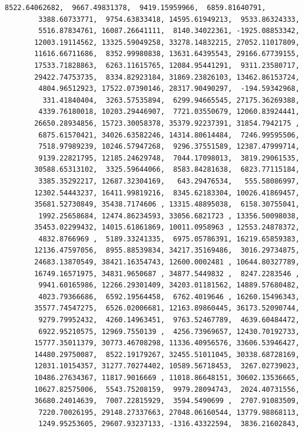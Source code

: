 \documentclass[11pt,a4paper]{report}
\begin{document}
\begin{tcolorbox}[breakable, size=fbox, boxrule=.5pt, pad at break*=1mm, opacityfill=0]
\begin{Verbatim}[commandchars=\\\{\}]
        8522.64062682,  9667.49831378,  9419.15959966,  6859.81640791,
        3388.60733771,  9754.63833418, 14595.61949213,  9533.86324333,
        5516.87834761, 16087.26641111,  8140.34022361, -1925.08853342,
       12003.19114562, 13325.59049258, 33278.14832215, 27052.11017809,
       11616.66711686,  8352.99980838, 13631.64395543, 29166.67739155,
       17533.71828863,  6263.11615765, 12084.95441291,  9311.23580717,
       29422.74753735,  8334.82923184, 31869.23826103, 13462.86153724,
        4804.96512923, 17522.07390146, 28317.90490297,  -194.59342968,
         331.41840404,  3263.57535894,  6299.94665545, 27175.36269388,
        4339.76180018, 10203.29446907,  7721.03550679, 12060.83924441,
       26650.28934856, 15723.30058378, 35379.92237391, 31854.7942175 ,
        6875.61570421, 34026.63582246, 14314.80614484,  7246.99595506,
        7518.97989239, 10246.57947268,  9296.37551589, 12387.47999714,
        9139.22821795, 12185.24629748,  7044.17098013,  3819.29061535,
       30588.65313102,  3325.59644066,  8583.84281638,  6823.77115184,
        3385.35292217, 12687.32304169,   643.29476534,   555.58086997,
       12302.54443237, 16411.99819216,  8345.62183304, 10026.41869457,
       35681.52730849, 35438.7174606 , 13315.48895038,  6158.30755041,
        1992.25658684, 12474.86234593, 33056.6821723 , 13356.50098038,
       35453.02299432, 14015.61861869, 10011.0958963 , 12553.24878372,
        4832.8766969 ,  5189.33241335,  6975.05786391, 16219.65859383,
       12136.47597056,  8955.88539834, 34217.35169486,  3016.29734875,
       24683.13870549, 38421.16354743, 12600.0002481 , 10644.80327789,
       16749.16571975, 34831.9650687 , 34877.5449832 ,  8247.2283546 ,
        9941.60165986, 12266.29301409, 34203.01181562, 14889.57680482,
        4023.79366686,  6592.19564458,  6762.4019646 , 16260.15496343,
       35577.74547275,  6526.02006681, 12163.89860445, 36173.52090744,
        9279.79952432,  4260.14963451,  9763.52467789,  4639.60484472,
        6922.95210575, 12969.7550139 ,  4256.73969657, 12430.70192733,
       15777.35011379, 30773.46708298, 11336.40956576, 33606.53946427,
       14480.29750087,  8522.19179267, 32455.51011045, 30338.68728169,
       12031.10154357, 31277.70274402, 10589.56718453,  3267.02739023,
       10486.27634367, 11817.9016669 , 11018.86648151, 30602.13536665,
       10627.82575006,  5543.75208159,  9979.28094743,  2024.40731556,
       36680.24014639,  7007.22815929,  3594.5490699 ,  2707.91083509,
        7220.70026195, 29148.27337663, 27048.06160544, 13779.98868113,
        1249.95253605, 29607.93237133, -1316.43322594,  3836.21602843,

\end{Verbatim}
\end{tcolorbox}
\end{document}
